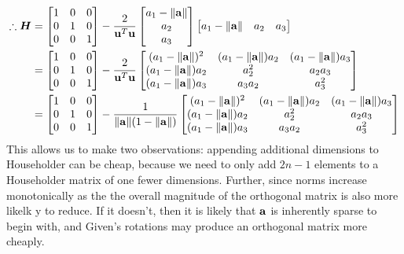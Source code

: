 \documentclass[]{exam}
\begin{document}
\begin{questions}
\begin{enumerate}[label=\arabic*.]
\begin{gather*}
\begin{aligned}
				\therefore \boldsymbol{H}
				&= \begin{bmatrix} 1 & 0 & 0 \\ 0 & 1 & 0 \\ 0 & 0 & 1 \end{bmatrix} - \frac{2}{\boldsymbol{\mathrm{u}}^T \boldsymbol{\mathrm{u}}} \begin{bmatrix} a_1 - \| \boldsymbol{\mathrm{a}} \| \\ a_2 \\ a_3 \end{bmatrix} \begin{bmatrix} a_1 - \| \boldsymbol{\mathrm{a}} \| & a_2 & a_3 \end{bmatrix} \\
				&= \begin{bmatrix} 1 & 0 & 0 \\ 0 & 1 & 0 \\ 0 & 0 & 1 \end{bmatrix} - \frac{2}{\boldsymbol{\mathrm{u}}^T \boldsymbol{\mathrm{u}}} \begin{bmatrix} (a_1 - \| \boldsymbol{\mathrm{a}} \|)^2 & (a_1 - \| \boldsymbol{\mathrm{a}} \|) a_2 & (a_1 - \| \boldsymbol{\mathrm{a}} \|) a_3 \\ (a_1 - \| \boldsymbol{\mathrm{a}} \|) a_2 & a_2^2 & a_2 a_3 \\ (a_1 - \| \boldsymbol{\mathrm{a}} \|) a_3 & a_3 a_2 & a_3^2 \end{bmatrix} \\
				&= \begin{bmatrix} 1 & 0 & 0 \\ 0 & 1 & 0 \\ 0 & 0 & 1 \end{bmatrix} - \frac{1}{\|\boldsymbol{\mathrm{a}}\|(1 - \|\boldsymbol{\mathrm{a}}\|)} \begin{bmatrix} (a_1 - \| \boldsymbol{\mathrm{a}} \|)^2 & (a_1 - \| \boldsymbol{\mathrm{a}} \|) a_2 & (a_1 - \| \boldsymbol{\mathrm{a}} \|) a_3 \\ (a_1 - \| \boldsymbol{\mathrm{a}} \|) a_2 & a_2^2 & a_2 a_3 \\ (a_1 - \| \boldsymbol{\mathrm{a}} \|) a_3 & a_3 a_2 & a_3^2 \end{bmatrix}
			\end{aligned}
		\end{gather*}
		This allows us to make two observations: appending additional dimensions to Householder can be cheap, because we need to only add $2n - 1$ elements to a Householder matrix of one fewer dimensions. Further, since norms increase monotonically as the the overall magnitude of the orthogonal matrix is also more likelk y to reduce. If it doesn't, then it is likely that $\boldsymbol{\mathrm{a}}$ is inherently sparse to begin with, and Given's rotations may produce an orthogonal matrix more cheaply.
\end{enumerate}

\end{questions}
\end{document}
